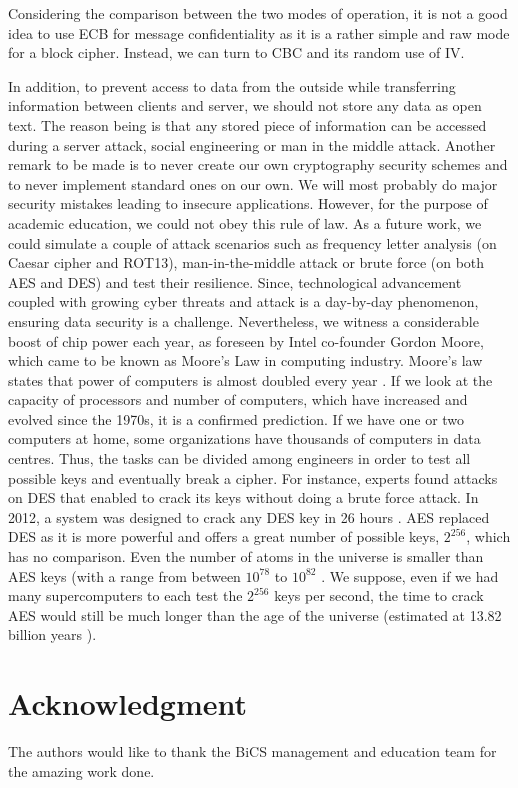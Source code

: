 Considering the comparison between the two modes of operation, it is not a good idea to use ECB for message confidentiality as it is a rather simple and raw mode for a block cipher. Instead, we can turn to CBC and its random use of IV. 

In addition, to prevent access to data from the outside while transferring information between clients and server, we should not store any data as open text. The reason being is that any stored piece of information can be accessed during a server attack, social engineering or man in the middle attack. Another remark to be made is to never create our own cryptography security schemes and to never implement standard ones on our own. We will most probably do major security mistakes leading to insecure applications. However, for the purpose of academic education, we could not obey this rule of law. 
As a future work, we could simulate a couple of attack scenarios such as frequency letter analysis (on Caesar cipher and ROT13), man-in-the-middle attack or brute force (on both AES and DES) and test their resilience. Since, technological advancement coupled with growing cyber threats and attack is a day-by-day phenomenon, ensuring data security is a challenge. Nevertheless, we witness a considerable boost of chip power each year, as foreseen by Intel co-founder Gordon Moore, which came to be known as Moore’s Law in computing industry. Moore’s law states that power of computers is almost doubled every year \cite{moore}. If we look at the capacity of processors and number of computers, which have increased and evolved since the 1970s, it is a confirmed prediction. If we have one or two computers at home, some organizations have thousands of computers in data centres. Thus, the tasks can be divided among engineers in order to test all possible keys and eventually break a cipher. For instance, experts found attacks on DES that enabled to crack its keys without doing a brute force attack. In 2012, a system was designed to crack any DES key in 26 hours \cite{crack.sh}. AES replaced DES as it is more powerful and offers a great number of possible keys, $2^{256}$, which has no comparison.  Even the number of atoms in the universe is smaller than AES keys (with a range from between $10^{78}$ to $10^{82}$ \cite{atoms}. We suppose, even if we had many supercomputers to each test the $2^{256}$ keys per second, the time to crack AES would still be much longer than the age of the universe (estimated at 13.82 billion years \cite{universe}).


\section*{Acknowledgment}
The authors would like to thank the BiCS management and education team for the amazing work done.

